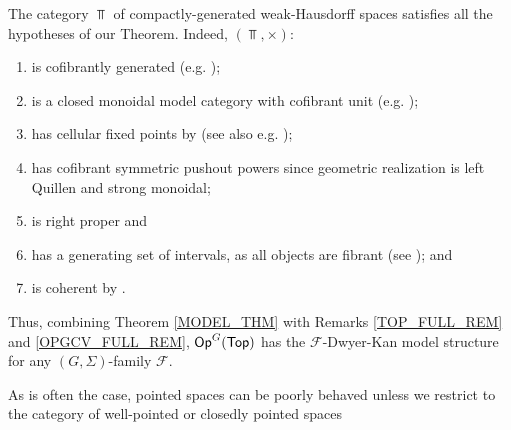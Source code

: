 \documentclass[a4paper,10pt
,draft
]{article}%
\renewcommand{\F}{\mathcal F}
\renewcommand{\1}{\eta}%
\begin{document}
      


\begin{example}
      The category $\Top$ of compactly-generated weak-Hausdorff spaces satisfies all the hypotheses of our Theorem.
      Indeed, $(\Top, \times)$:
      \begin{enumerate}[label = (\roman*)]\itemsep-4pt
      \item is cofibrantly generated (e.g. \cite{Pia91});
      \item is a closed monoidal model category with cofibrant unit (e.g. \cite[Prop. 4.2.11]{Hov99});
      \item has cellular fixed points by \cite{Pia91} (see also e.g. \cite[Lemma 3.18]{Ste16});
      \item has cofibrant symmetric pushout powers since geometric realization is left Quillen and strong monoidal;
      \item is right proper and
      \item has a generating set of intervals, as all objects are fibrant (see \cite[Lemma 2.1]{BM13}); and
      \item is coherent by \cite[Lem. 4.16]{BV73}.
      \end{enumerate}
      Thus, combining Theorem \ref{MODEL_THM} with Remarks \ref{TOP_FULL_REM} and \ref{OPGCV_FULL_REM},
      $\mathsf{Op}^G(\mathsf{Top})$ has the $\F$-Dwyer-Kan model structure for any $(G, \Sigma)$-family $\F$. %

      As is often the case, pointed spaces can be poorly behaved unless we restrict to the category of well-pointed or closedly pointed spaces 
\end{example}
\end{document}
